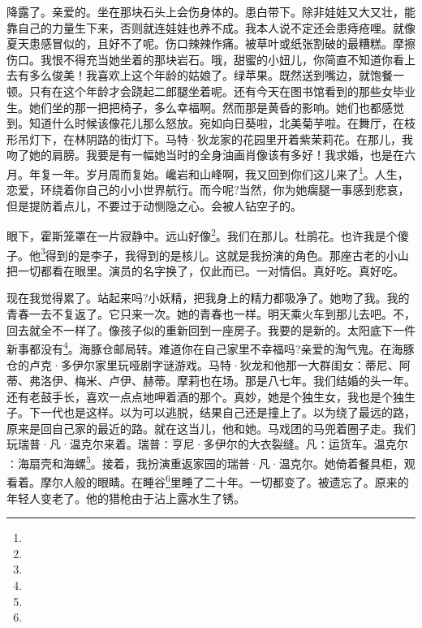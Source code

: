 \par 降露了。亲爱的。坐在那块石头上会伤身体的。患白带下。除非娃娃又大又壮，能靠自己的力量生下来，否则就连娃娃也养不成。我本人说不定还会患痔疮哩。就像夏天患感冒似的，且好不了呢。伤口辣辣作痛。被草叶或纸张割破的最糟糕。摩擦伤口。我恨不得充当她坐着的那块岩石。哦，甜蜜的小妞儿，你简直不知道你看上去有多么俊美！我喜欢上这个年龄的姑娘了。绿苹果。既然送到嘴边，就饱餐一顿。只有在这个年龄才会跷起二郎腿坐着呢。还有今天在图书馆看到的那些女毕业生。她们坐的那一把把椅子，多么幸福啊。然而那是黄昏的影响。她们也都感觉到。知道什么时候该像花儿那么怒放。宛如向日葵啦，北美菊芋啦。在舞厅，在枝形吊灯下，在林阴路的街灯下。马特·狄龙家的花园里开着紫茉莉花。在那儿，我吻了她的肩膀。我要是有一幅她当时的全身油画肖像该有多好！我求婚，也是在六月。年复一年。岁月周而复始。巉岩和山峰啊，我又回到你们这儿来了\footnote{}。人生，恋爱，环绕着你自己的小小世界航行。而今呢?当然，你为她瘸腿一事感到悲哀，但是提防着点儿，不要过于动恻隐之心。会被人钻空子的。
\par 眼下，霍斯笼罩在一片寂静中。远山好像\footnote{}。我们在那儿。杜鹃花。也许我是个傻子。他\footnote{}得到的是李子，我得到的是核儿。这就是我扮演的角色。那座古老的小山把一切都看在眼里。演员的名字换了，仅此而已。一对情侣。真好吃。真好吃。
\par 现在我觉得累了。站起来吗?小妖精，把我身上的精力都吸净了。她吻了我。我的青春一去不复返了。它只来一次。她的青春也一样。明天乘火车到那儿去吧。不，回去就全不一样了。像孩子似的重新回到一座房子。我要的是新的。太阳底下一件新事都没有\footnote{}。海豚仓邮局转。难道你在自己家里不幸福吗?亲爱的淘气鬼。在海豚仓的卢克·多伊尔家里玩哑剧字谜游戏。马特·狄龙和他那一大群闺女：蒂尼、阿蒂、弗洛伊、梅米、卢伊、赫蒂。摩莉也在场。那是八七年。我们结婚的头一年。还有老鼓手长，喜欢一点点地呷着酒的那个。真妙，她是个独生女，我也是个独生子。下一代也是这样。以为可以逃脱，结果自己还是撞上了。以为绕了最远的路，原来是回自己家的最近的路。就在这当儿，他和她。马戏团的马兜着圈子走。我们玩瑞普·凡·温克尔来着。瑞普∶亨尼·多伊尔的大衣裂缝。凡∶运货车。温克尔∶海扇壳和海螺\footnote{}。接着，我扮演重返家园的瑞普·凡·温克尔。她倚着餐具柜，观看着。摩尔人般的眼睛。在睡谷\footnote{}里睡了二十年。一切都变了。被遗忘了。原来的年轻人变老了。他的猎枪由于沾上露水生了锈。

